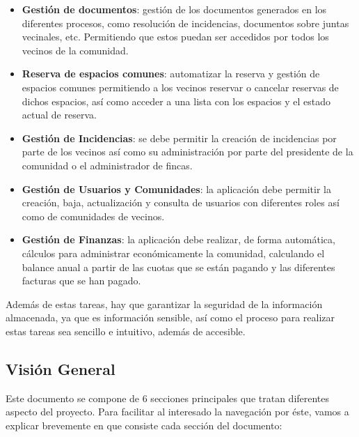 \begin{itemize}
	\item \textbf{Gestión de documentos}: gestión de los documentos generados en los diferentes procesos, como resolución de incidencias, documentos sobre juntas vecinales, etc. Permitiendo que estos puedan ser accedidos por todos los vecinos de la comunidad.
	
	\item \textbf{Reserva de espacios comunes}: automatizar la reserva y gestión de espacios comunes permitiendo a los vecinos reservar o cancelar reservas de dichos espacios, así como acceder a una lista con los espacios y el estado actual de reserva.
	
	\item \textbf{Gestión de Incidencias}: se debe permitir la creación de incidencias por parte de los vecinos así como su administración por parte del presidente de la comunidad o el administrador de fincas.
	
	\item \textbf{Gestión de Usuarios y Comunidades}: la aplicación debe permitir la creación, baja, actualización y consulta de usuarios con diferentes roles así como de comunidades de vecinos.
	
	\item \textbf{Gestión de Finanzas}: la aplicación debe realizar, de forma automática, cálculos para administrar económicamente la comunidad, calculando el balance anual a partir de las cuotas que se están pagando y las diferentes facturas que se han pagado.
\end{itemize}

Además de estas tareas, hay que garantizar la seguridad de la información almacenada, ya que es información sensible, así como el proceso para realizar estas tareas sea sencillo e intuitivo, además de accesible. 

\subsection{Visión General}
Este documento se compone de 6 secciones principales que tratan diferentes aspecto del proyecto. Para facilitar al interesado la navegación por éste, vamos a explicar brevemente en que consiste cada sección del documento:

